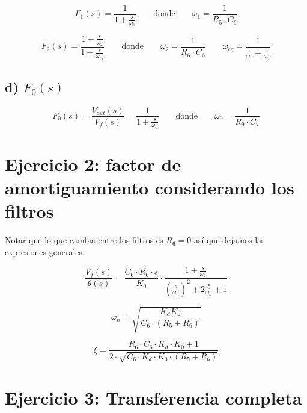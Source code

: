 \documentclass{article}
\begin{document}
\begin{equation} \label{f1_eqn}
F_1(s) = \frac{1}{ 1 + \frac{s}{\omega_1}
}
\qquad \text{donde} \qquad \omega_1=\frac{1}{R_5\cdot C_6} 
\end{equation}


\begin{equation} \label{f2_eqn}
F_2(s) = \frac{1+\frac{s}{\omega_2}}{ 1 + \frac{s}{\omega_{eq}}} \qquad \text{donde} \qquad \omega_2=\frac{1}{R_6\cdot C_6} \qquad \omega_{eq} = \frac{1}{\frac{1}{\omega_1} + \frac{1}{\omega_2}} 
\end{equation}


\subsection*{d) $F_0(s)$}

\begin{equation} \label{fo_eqn}
F_0(s) = \frac{V_{out}(s)}{V_f(s)} = \frac{1}{ 1 + \frac{s}{\omega_0}} \qquad \text{donde} \qquad \omega_0=\frac{1}{R_9\cdot C_7}
\end{equation}


\section*{Ejercicio 2: factor de amortiguamiento considerando los filtros}

Notar que lo que cambia entre los filtros es $R_6 = 0$ así que dejamos las expresiones generales.

\begin{equation} \label{vftheta_eqn}
\frac{V_f(s)}{\theta(s)} = \frac{C_6 \cdot R_6 \cdot s}{K_0}
\cdot \frac{ 1 + \frac{s}{\omega_2} }
{ \left(\frac{s}{\omega_n}\right)^2 + 2\frac{\xi}{\omega_n}  + 1}
\end{equation}

\begin{equation} \label{wn_eqn}
\omega_n = \sqrt{\frac{K_d K_0}{C_6\cdot(R_5+R_6)}}
\end{equation}


\begin{equation} \label{xi_eqn}
\xi = \frac{R_6 \cdot C_6\cdot K_d\cdot K_0  + 1}
{2\cdot \sqrt{C_6 \cdot K_d \cdot K_0 \cdot(R_5 + R_6)}}
\end{equation}

\section*{Ejercicio 3: Transferencia completa}
\end{document}
